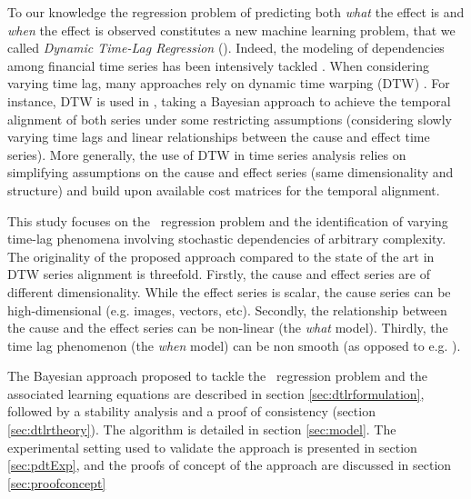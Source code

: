 To our knowledge the regression problem of predicting both {\em what} the effect is and {\em when} the effect 
is observed constitutes a new machine learning problem, that we called {\em Dynamic Time-Lag Regression} (\XX). 
Indeed, the modeling of dependencies among financial time series has been intensively tackled \citep{ZHOU2006195}. 
When considering varying time lag, many approaches rely on dynamic time warping (DTW) \citep{SakoeShiba1978}. 
For instance, DTW is used in \citet{SignalDiffusion}, taking a Bayesian approach to achieve the temporal alignment 
of both series under some restricting assumptions (considering slowly varying time lags and linear relationships 
between the cause and effect time series). More generally, the use of DTW in time series analysis relies on 
simplifying assumptions on the cause and effect series (same dimensionality and structure) and build upon 
available cost matrices for the temporal alignment. 

This study focuses on the \XX\ regression problem and the identification of varying time-lag phenomena involving 
stochastic dependencies of arbitrary complexity. The originality of the proposed approach compared to the state of 
the art in DTW series alignment is threefold. Firstly, the cause and effect series are of different dimensionality. 
While the effect series is scalar, the cause series can be high-dimensional (e.g. images, vectors, etc). 
Secondly, the relationship between the cause and the effect series can be non-linear (the {\em what} model). 
Thirdly, the time lag phenomenon (the {\em when} model) can be non smooth (as opposed to e.g. \citet{ZHOU2006195}).

The Bayesian approach proposed to tackle the \XX\ regression problem and the associated learning 
equations are described in section \ref{sec:dtlrformulation}, followed by a stability analysis and a 
proof of consistency (section \ref{sec:dtlrtheory}). The algorithm is detailed in section \ref{sec:model}. 
The experimental setting used to validate the approach is presented in section \ref{sec:pdtExp}, and 
the proofs of concept of the approach are discussed in section \ref{sec:proofconcept}

